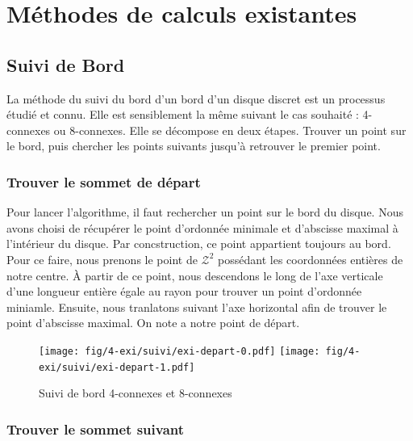 \section{Méthodes de calculs existantes}

\subsection{Suivi de Bord}

La méthode du suivi du bord d'un bord d'un disque discret est un processus étudié et connu. Elle est sensiblement la même suivant le cas souhaité : 4-connexes ou 8-connexes. Elle se décompose en deux étapes. Trouver un point sur le bord, puis chercher les points suivants jusqu'à retrouver le premier point.

\subsubsection{Trouver le sommet de départ}

Pour lancer l'algorithme, il faut rechercher un point sur le bord du disque. Nous avons choisi de récupérer le point d'ordonnée minimale et d'abscisse maximal à l'intérieur du disque. Par concstruction, ce point appartient toujours au bord. Pour ce faire, nous prenons le point de $\mathcal{Z}^2$ possédant les coordonnées entières de notre centre. À partir de ce point, nous descendons le long de l'axe verticale d'une longueur entière égale au rayon pour trouver un point d'ordonnée miniamle. Ensuite, nous tranlatons suivant l'axe horizontal afin de trouver le point d'abscisse maximal. On note a notre point de départ. 

\begin{figure}[h!]
  \centering
  \texttt{[image: fig/4-exi/suivi/exi-depart-0.pdf]}
  \texttt{[image: fig/4-exi/suivi/exi-depart-1.pdf]}
  \caption{Suivi de bord 4-connexes et 8-connexes}
\end{figure}
  

\subsubsection{Trouver le sommet suivant}

